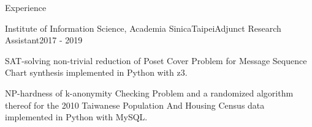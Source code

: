 \documentclass{resume} %
\begin{document}
\begin{rSection}{Experience}
\begin{rSubsection}{Institute of Information Science, Academia Sinica}{Taipei}{Adjunct Research Assistant}{2017 - 2019}
\item SAT-solving non-trivial reduction of Poset Cover Problem for Message Sequence Chart synthesis implemented in Python with z3.
\item NP-hardness of k-anonymity Checking Problem and a randomized algorithm thereof for the 2010 Taiwanese Population And Housing Census data implemented in Python with MySQL.
\end{rSubsection}

\end{rSection}






\end{document}
